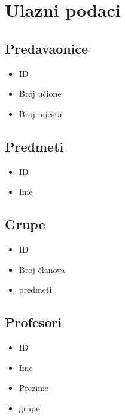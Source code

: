 \section{Ulazni podaci}
  \subsection{Predavaonice}
    \begin{itemize}
      \item ID
      \item Broj učione
      \item Broj mjesta
    \end{itemize}
  \subsection{Predmeti}
    \begin{itemize}
      \item ID
      \item Ime
    \end{itemize}
  \subsection{Grupe}
    \begin{itemize}
      \item ID
      \item Broj članova
      \item predmeti
    \end{itemize}
  \subsection{Profesori}
    \begin{itemize}
      \item ID
      \item Ime
      \item Prezime
      \item grupe
    \end{itemize}

